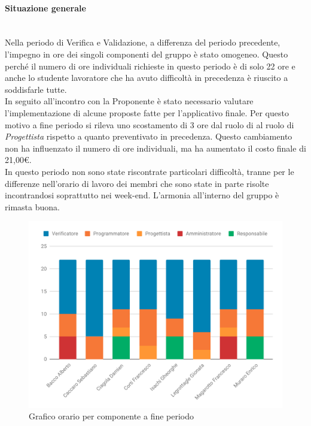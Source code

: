 \paragraph{Situazione generale} \mbox{}\\
Nella periodo di Verifica e Validazione, a differenza del periodo precedente, l'impegno in ore dei singoli componenti del gruppo è stato omogeneo. Questo perché il numero di ore individuali richieste in questo periodo è di solo 22 ore e anche lo studente lavoratore che ha avuto difficoltà in precedenza è riuscito a soddisfarle tutte.\\
In seguito all'incontro con la Proponente è stato necessario valutare l'implementazione di alcune proposte fatte per l'applicativo finale. Per questo motivo a fine periodo si rileva uno scostamento di 3 ore dal ruolo di \progr{} al ruolo di \textit{Progettista} rispetto a quanto preventivato in precedenza. Questo cambiamento non ha influenzato il numero di ore individuali, ma ha aumentato il costo finale di 21,00\euro. \\
In questo periodo non sono state riscontrate particolari difficoltà, tranne per le differenze nell'orario di lavoro dei membri che sono state in parte risolte incontrandosi soprattutto nei week-end. L'armonia all'interno del gruppo è rimasta buona.\\

\begin{figure}[H]
	\centering
	\includegraphics[scale=.8]{Consuntivo/grafici/ConsVer.pdf} 
	\caption{Grafico orario per componente a fine periodo}
\end{figure}